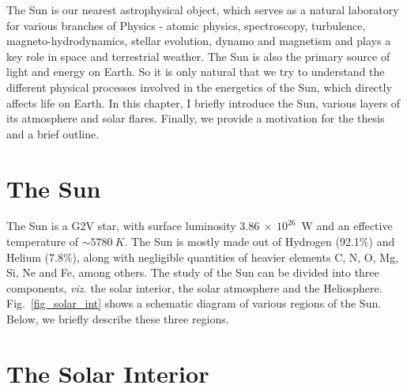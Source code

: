 \justifying

The Sun is our nearest astrophysical object, which serves as a natural laboratory for various branches of Physics - atomic physics, spectroscopy, turbulence, magneto-hydrodynamics, stellar evolution, dynamo and magnetism and plays a key role in space and terrestrial weather. The Sun is also the primary source of light and energy on Earth. So it is only natural that we try to understand the different physical processes involved in the energetics of the Sun, which directly affects life on Earth. In this chapter, I briefly introduce the Sun, various layers of its atmosphere and solar flares. Finally, we provide a motivation for the thesis and a brief outline.

\section{The Sun}\label{Sun}

The Sun is a G2V star, with surface luminosity $3.86~\times~10^{26}$~W and an effective temperature of $\sim 5780~K$. The Sun is mostly made out of Hydrogen (92.1\%) and Helium (7.8\%), along with negligible quantities of heavier elements C, N, O, Mg, Si, Ne and Fe, among others. The study of the Sun can be divided into three components, \textit{viz.} the solar interior, the solar atmosphere and the Heliosphere. Fig.~\ref{fig_solar_int} shows a schematic diagram of various regions of the Sun. Below, we briefly describe these three regions.

\section{The Solar Interior}\label{solar_int} 

